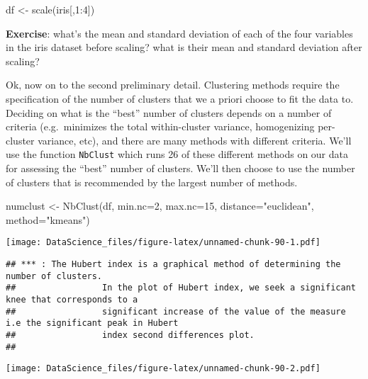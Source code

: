 \documentclass[
]{book}
\newenvironment{Shaded}{\begin{snugshade}}{\end{snugshade}}
\newcommand{\AttributeTok}[1]{\textcolor[rgb]{0.77,0.63,0.00}{#1}}
\newcommand{\DecValTok}[1]{\textcolor[rgb]{0.00,0.00,0.81}{#1}}
\newcommand{\FunctionTok}[1]{\textcolor[rgb]{0.00,0.00,0.00}{#1}}
\newcommand{\NormalTok}[1]{#1}
\newcommand{\OtherTok}[1]{\textcolor[rgb]{0.56,0.35,0.01}{#1}}
\newcommand{\SpecialCharTok}[1]{\textcolor[rgb]{0.00,0.00,0.00}{#1}}
\newcommand{\StringTok}[1]{\textcolor[rgb]{0.31,0.60,0.02}{#1}}
\begin{document}
\begin{Shaded}
\begin{Highlighting}[]
\NormalTok{df }\OtherTok{\textless{}{-}} \FunctionTok{scale}\NormalTok{(iris[,}\DecValTok{1}\SpecialCharTok{:}\DecValTok{4}\NormalTok{])}
\end{Highlighting}
\end{Shaded}

\textbf{Exercise}: what's the mean and standard deviation of each of the four variables in the iris dataset before scaling? what is their mean and standard deviation after scaling?

Ok, now on to the second preliminary detail. Clustering methods require the specification of the number of clusters that we a priori choose to fit the data to. Deciding on what is the ``best'' number of clusters depends on a number of criteria (e.g.~minimizes the total within-cluster variance, homogenizing per-cluster variance, etc), and there are many methods with different criteria. We'll use the function \texttt{NbClust} which runs 26 of these different methods on our data for assessing the ``best'' number of clusters. We'll then choose to use the number of clusters that is recommended by the largest number of methods.

\begin{Shaded}
\begin{Highlighting}[]
\NormalTok{numclust }\OtherTok{\textless{}{-}} \FunctionTok{NbClust}\NormalTok{(df, }\AttributeTok{min.nc=}\DecValTok{2}\NormalTok{, }\AttributeTok{max.nc=}\DecValTok{15}\NormalTok{, }\AttributeTok{distance=}\StringTok{"euclidean"}\NormalTok{, }\AttributeTok{method=}\StringTok{"kmeans"}\NormalTok{)}
\end{Highlighting}
\end{Shaded}

\texttt{[image: DataScience\_files/figure-latex/unnamed-chunk-90-1.pdf]}

\begin{verbatim}
## *** : The Hubert index is a graphical method of determining the number of clusters.
##                 In the plot of Hubert index, we seek a significant knee that corresponds to a 
##                 significant increase of the value of the measure i.e the significant peak in Hubert
##                 index second differences plot. 
## 
\end{verbatim}

\texttt{[image: DataScience\_files/figure-latex/unnamed-chunk-90-2.pdf]}
\end{document}
